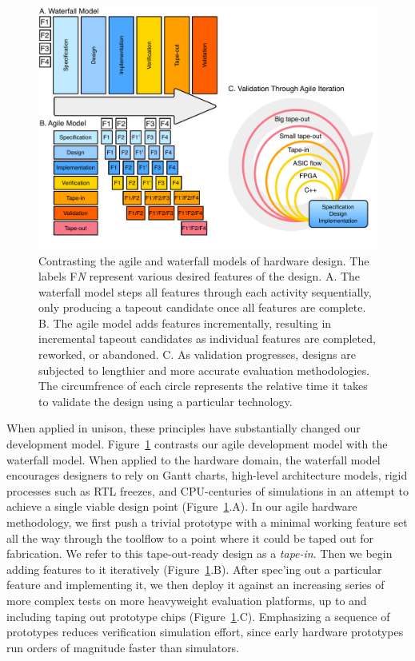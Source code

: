 \begin{figure}[t!]
\centering
\includegraphics[width=1\columnwidth]{intro/figures/agile.pdf}
\caption[Contrasting the agile and waterfall models of hardware development.]{
Contrasting the agile and waterfall models of hardware design.  The labels F{\em N} represent various desired features of the design.
A. The waterfall model steps all features through each activity
sequentially, only producing a tapeout candidate once all features are complete.
B. The agile model adds features incrementally, resulting in incremental tapeout candidates as individual features are
completed, reworked, or abandoned.
C. As validation progresses, designs are subjected to lengthier and more accurate evaluation methodologies.
The circumfrence of each circle represents the relative time it takes to validate the design using a particular technology.
}
\label{fig:agile}
\end{figure}

When applied in unison, these principles have substantially changed our development model.
Figure~\ref{fig:agile} contrasts our agile development model with the waterfall model.
When applied to the hardware domain, the waterfall model encourages designers to rely on Gantt
charts, high-level architecture models, rigid processes such as RTL
freezes, and CPU-centuries of simulations in an attempt to achieve a
single viable design point (Figure~\ref{fig:agile}.A). 
In our agile hardware methodology, we first push a trivial prototype with a minimal working feature set all the way through the toolflow to a point where it could be taped out for fabrication.
We refer to this tape-out-ready design as a {\em tape-in}.
Then we begin adding features to it iteratively (Figure~\ref{fig:agile}.B).
After spec'ing out a particular feature and implementing it, 
we then deploy it against an increasing series of more complex tests on more heavyweight evaluation platforms, up to and including taping out prototype chips (Figure~\ref{fig:agile}.C).
Emphasizing a sequence of prototypes reduces verification simulation effort, since early hardware prototypes run orders of magnitude faster than simulators. 

